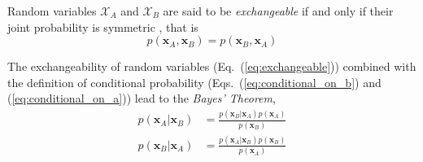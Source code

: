 Random variables $\bm{\mathcal{X}}_A$ and $\bm{\mathcal{X}}_B$ are said to be \emph{exchangeable}
if and only if their joint probability is symmetric \cite{Greenland2005}, that is
\begin{equation}
  p(\bm{x}_A, \bm{x}_B) = p(\bm{x}_B, \bm{x}_A)
\label{eq:exchangeable}
\end{equation}

The exchangeability of random variables (Eq.~(\ref{eq:exchangeable})) combined with the definition of conditional probability (Eqs.~(\ref{eq:conditional_on_b}) and (\ref{eq:conditional_on_a})) lead to the \emph{Bayes' Theorem},
\begin{equation}
  \begin{split}
    p(\bm{x}_A | \bm{x}_B) & = \frac{p(\bm{x}_B | \bm{x}_A) p(\bm{x}_A)}{p(\bm{x}_B)} \\
    p(\bm{x}_B | \bm{x}_A) & = \frac{p(\bm{x}_A | \bm{x}_B) p(\bm{x}_B)}{p(\bm{x}_A)}
  \end{split}
\label{eq:bayes_theorem}
\end{equation}
